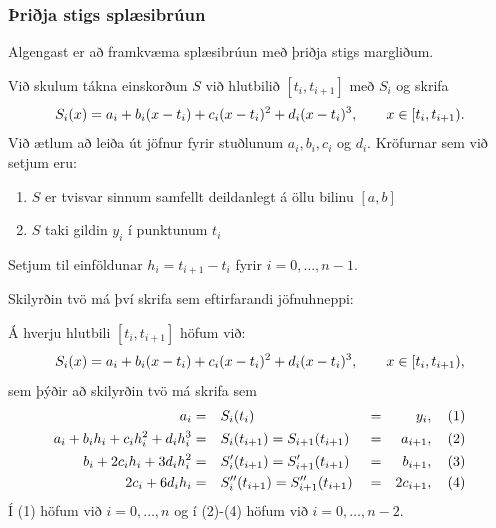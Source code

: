 \documentclass[a4paper,10pt,icelandic]{sphinxmanual}
\begin{document}

\subsubsection{Þriðja stigs splæsibrúun}
\label{kafli03:index-21}\label{kafli03:rija-stigs-splaesibruun}
Algengast er að framkvæma splæsibrúun með þriðja stigs margliðum.

Við skulum tákna einskorðun \(S\) við hlutbilið
\([t_i,t_{i+1}]\) með \(S_i\) og skrifa
\begin{gather}
\begin{split}S_i(x) = a_i+b_i(x-t_i)+c_i(x-t_i)^2+d_i(x-t_i)^3,
        \qquad x\in [t_i,t_{i+1}).\end{split}\notag
\end{gather}
Við ætlum að leiða út jöfnur fyrir stuðlunum \(a_i, b_i, c_i\) og
\(d_i\). Kröfurnar sem við setjum eru:
\begin{enumerate}
\item {} 
\(S\) er tvisvar sinnum samfellt deildanlegt á öllu bilinu \([a,b]\)

\item {} 
\(S\) taki gildin \(y_i\) í punktunum \(t_i\)

\end{enumerate}

Setjum til einföldunar \(h_i = t_{i+1}-t_i\) fyrir \(i = 0,
\ldots, n-1\).

Skilyrðin tvö má því skrifa sem eftirfarandi jöfnuhneppi:

Á hverju hlutbili \([t_i,t_{i+1}]\) höfum við:
\begin{gather}
\begin{split}S_i(x) = a_i+b_i(x-t_i)+c_i(x-t_i)^2+d_i(x-t_i)^3,
        \qquad x\in [t_i,t_{i+1}),\end{split}\notag
\end{gather}
sem þýðir að skilyrðin tvö má skrifa sem
\begin{gather}
\begin{split}\begin{aligned}
    a_i &=& &S_i(t_i)& &=& y_i
        &, \quad (1) \\
    a_i + b_ih_i + c_ih_i^2 + d_ih_i^3 &=& &S_i(t_{i+1})
        = S_{i+1}(t_{i+1})& &=& a_{i+1}
        &, \quad (2) \\
    b_i + 2c_ih_i + 3d_ih_i^2 &=& &S_i'(t_{i+1})
        = S_{i+1}'(t_{i+1})& &=& b_{i+1}
        &, \quad (3) \\
    2c_i + 6d_ih_i &=& &S_i''(t_{i+1})
        = S_{i+1}''(t_{i+1})& &=& 2c_{i+1}
        &, \quad (4)\end{aligned}\end{split}\notag
\end{gather}
Í (1) höfum við \(i = 0,\ldots,n\) og í (2)-(4) höfum við
\(i=0,\ldots,n-2\).
\end{document}
